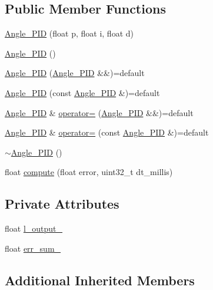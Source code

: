 \subsection*{Public Member Functions}
\begin{DoxyCompactItemize}
\item 
\mbox{\hyperlink{class_angle___p_i_d_a5634b51e00e8d4c80332dcae7968f064}{Angle\+\_\+\+P\+ID}} (float p, float i, float d)
\item 
\mbox{\hyperlink{class_angle___p_i_d_a9d60514c940a5f5fefb3414c54277b1b}{Angle\+\_\+\+P\+ID}} ()
\item 
\mbox{\hyperlink{class_angle___p_i_d_a282e2689a294ecb94c36a0b35ffb300f}{Angle\+\_\+\+P\+ID}} (\mbox{\hyperlink{class_angle___p_i_d}{Angle\+\_\+\+P\+ID}} \&\&)=default
\item 
\mbox{\hyperlink{class_angle___p_i_d_a0fda8391de7ef06804c7655503805469}{Angle\+\_\+\+P\+ID}} (const \mbox{\hyperlink{class_angle___p_i_d}{Angle\+\_\+\+P\+ID}} \&)=default
\item 
\mbox{\hyperlink{class_angle___p_i_d}{Angle\+\_\+\+P\+ID}} \& \mbox{\hyperlink{class_angle___p_i_d_a5cfa125406d0dd0504ccea19afec486c}{operator=}} (\mbox{\hyperlink{class_angle___p_i_d}{Angle\+\_\+\+P\+ID}} \&\&)=default
\item 
\mbox{\hyperlink{class_angle___p_i_d}{Angle\+\_\+\+P\+ID}} \& \mbox{\hyperlink{class_angle___p_i_d_a6f3d083d91de2de8e8a36204f375f279}{operator=}} (const \mbox{\hyperlink{class_angle___p_i_d}{Angle\+\_\+\+P\+ID}} \&)=default
\item 
\mbox{\hyperlink{class_angle___p_i_d_a3dd451d850fd7805b36b0e969bf13e66}{$\sim$\+Angle\+\_\+\+P\+ID}} ()
\item 
float \mbox{\hyperlink{class_angle___p_i_d_a3816cd7799d40587898c0a3def37ae5e}{compute}} (float error, uint32\+\_\+t dt\+\_\+millis)
\end{DoxyCompactItemize}
\subsection*{Private Attributes}
\begin{DoxyCompactItemize}
\item 
float \mbox{\hyperlink{class_angle___p_i_d_a16d9de5cbedec4c1597b6c6c31901060}{l\+\_\+output\+\_\+}}
\item 
float \mbox{\hyperlink{class_angle___p_i_d_a5c0c630668fdf19208e51d1fc404d21d}{err\+\_\+sum\+\_\+}}
\end{DoxyCompactItemize}
\subsection*{Additional Inherited Members}


